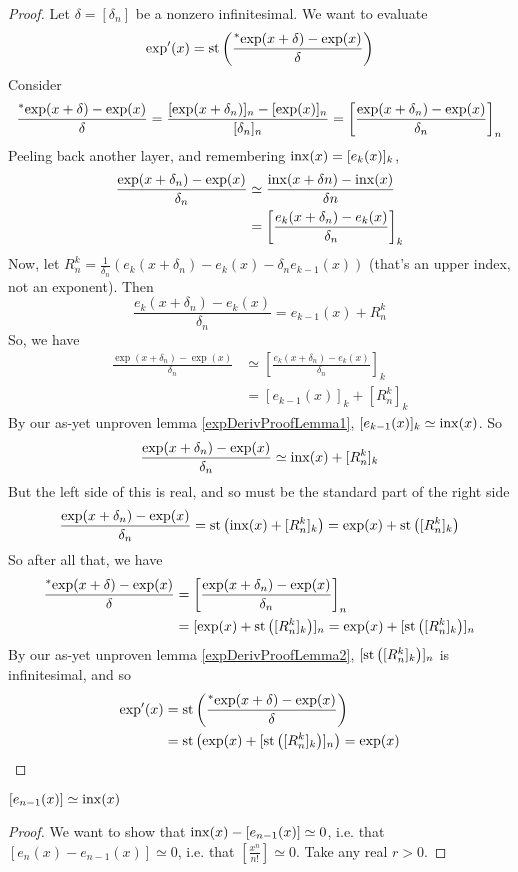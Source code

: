 \begin{proof}
    Let $\delta = [\delta_n]$ be a nonzero infinitesimal. We want to evaluate
    \[ \exp'(x) = \operatorname{st}\left(\frac{\prescript{*}{}{\exp}(x + \delta) - \exp(x)}{\delta}\right) \]
    Consider
    \[ \frac{\prescript{*}{}{\exp}(x + \delta) - \exp(x)}{\delta} = \frac{[\exp(x+\delta_n)]_n - [\exp(x)]_n}{[\delta_n]_n} = \left[ \frac{\exp(x + \delta_n) - \exp(x)}{\delta_n} \right]_n \]
    Peeling back another layer, and remembering $\operatorname{inx}(x) = [e_k(x)]_k$,
    \begin{align*}
    \frac{\exp(x + \delta_n) - \exp(x)}{\delta_n} &\simeq \frac{\operatorname{inx}(x + \delta n) - \operatorname{inx}(x)}{\delta n} \\
    &= \left[ \frac{e_k(x + \delta_n) - e_k(x)}{\delta_n} \right]_k
    \end{align*}
    Now, let $R_n^k = \frac{1}{\delta_n}(e_k(x + \delta_n) - e_k(x) - \delta_n e_{k-1}(x))$ (that's an upper index, not an exponent). Then 
    \[ \frac{e_k(x+\delta_n) - e_k(x)}{\delta_n} = e_{k-1}(x) + R_n^k \]
    So, we have 
    \begin{align*}
    \frac{\exp(x + \delta_n) - \exp(x)}{\delta_n} &\simeq \left[ \frac{e_k(x + \delta_n) - e_k(x)}{\delta_n} \right]_k \\
    &= [e_{k-1}(x)]_k + [R_n^k]_k
    \end{align*}
    By our as-yet unproven lemma \ref{expDerivProofLemma1}, $[e_{k-1}(x)]_k \simeq \operatorname{inx}(x)$. So
    \[ \frac{\exp(x + \delta_n) - \exp(x)}{\delta_n} \simeq \operatorname{inx}(x) + [R_n^k]_k \]
    But the left side of this is real, and so must be the standard part of the right side
    \[ \frac{\exp(x + \delta_n) - \exp(x)}{\delta_n} = \operatorname{st}\left(\operatorname{inx}(x) + [R_n^k]_k\right) = \exp(x) + \operatorname{st}\left([R_n^k]_k\right) \]
    So after all that, we have 
    \begin{align*}
    \frac{\prescript{*}{}{\exp}(x + \delta) - \exp(x)}{\delta} &= \left[ \frac{\exp(x + \delta_n) - \exp(x)}{\delta_n} \right]_n \\
        &= [\exp(x) + \operatorname{st}\left([R_n^k]_k\right)]_n = \exp(x) + [\operatorname{st}\left([R_n^k]_k\right)]_n
    \end{align*}
    By our as-yet unproven lemma \ref{expDerivProofLemma2}, $[\operatorname{st}\left([R_n^k]_k\right)]_n$ is infinitesimal, and so
    \begin{align*}
    \exp'(x) &= \operatorname{st}\left(\frac{\prescript{*}{}{\exp}(x + \delta) - \exp(x)}{\delta}\right) \\
    &= \operatorname{st}\left(\exp(x) + [\operatorname{st}\left([R_n^k]_k\right)]_n\right) = \exp(x)
    \end{align*}
\end{proof}

\begin{lemma}\label{expDerivProofLemma1}
    $[e_{n-1}(x)] \simeq \operatorname{inx}(x)$
\end{lemma}
\begin{proof}
    We want to show that $\operatorname{inx}(x) - [e_{n-1}(x)] \simeq 0$, i.e. that $[e_n(x) - e_{n-1}(x)] \simeq 0$, i.e. that $[\frac{x^n}{n!}] \simeq 0$. Take any real $r > 0$.  
\end{proof}

\begin{lemma}\label{expDerivProofLemma2}
    
\end{lemma}